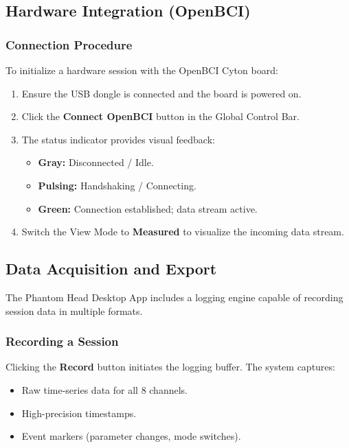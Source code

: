 \subsection{Hardware Integration (OpenBCI)}

\subsubsection{Connection Procedure}
To initialize a hardware session with the OpenBCI Cyton board:
\begin{enumerate}
    \item Ensure the USB dongle is connected and the board is powered on.
    \item Click the \textbf{Connect OpenBCI} button in the Global Control Bar.
    \item The status indicator provides visual feedback:
    \begin{itemize}
        \item \textbf{Gray:} Disconnected / Idle.
        \item \textbf{Pulsing:} Handshaking / Connecting.
        \item \textbf{Green:} Connection established; data stream active.
    \end{itemize}
    \item Switch the View Mode to \textbf{Measured} to visualize the incoming data stream.
\end{enumerate}

\subsection{Data Acquisition and Export}

The Phantom Head Desktop App includes a logging engine capable of recording session data in multiple formats.

\subsubsection{Recording a Session}
Clicking the \textbf{Record} button initiates the logging buffer. The system captures:
\begin{itemize}
    \item Raw time-series data for all 8 channels.
    \item High-precision timestamps.
    \item Event markers (parameter changes, mode switches).
\end{itemize}

